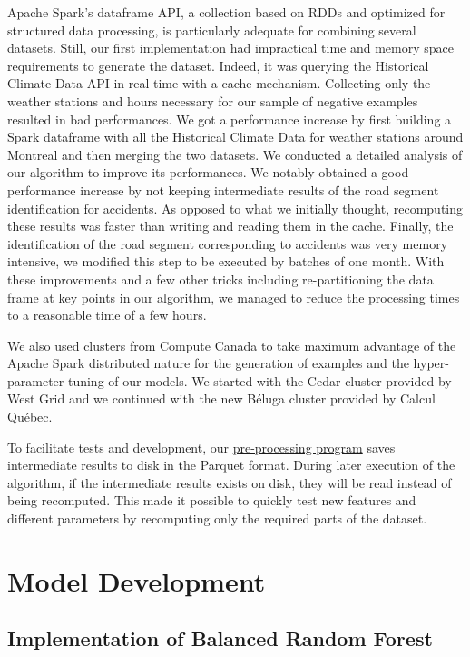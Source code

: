 \documentclass[conference]{IEEEtran}
\begin{document}
Apache Spark's dataframe API, a collection based on RDDs and optimized for 
structured data processing, is particularly adequate for
combining several datasets. Still, our first implementation had impractical
time and memory space requirements to generate the dataset. Indeed, it was querying
the Historical Climate Data API in real-time with a cache mechanism.
Collecting only the weather stations and hours necessary for our
sample of negative examples resulted in bad performances. We got a
performance increase by first building a Spark dataframe with all the
Historical Climate Data for weather stations around Montreal and then
merging the two datasets. We conducted a detailed analysis of our algorithm
to improve its performances. We notably obtained a good performance
increase by not keeping intermediate results of the road segment
identification for accidents. As opposed to what we initially thought,
recomputing these results was faster than writing and reading them in the
cache. Finally, the identification of the road segment corresponding to
accidents was very memory intensive, we modified this step to be executed
by batches of one month. With these improvements and a few other tricks
including re-partitioning the data frame at key points in our algorithm, we
managed to reduce the processing times to a reasonable time of a few hours.

We also used clusters from Compute Canada to take maximum advantage of the Apache Spark distributed nature for the generation of examples and the hyper-parameter tuning of our models. We started with the Cedar cluster provided by West Grid and we continued with the new B\'eluga cluster provided by Calcul Québec.

To facilitate tests and development, our \href{https://github.com/big-data-lab-team/accident-prediction-montreal/blob/master/preprocess.py}{pre-processing program} saves intermediate results to disk in the Parquet format. During later execution of the algorithm, if the intermediate results exists on disk, they will be read instead of being recomputed. This made it possible to quickly test new features and different parameters by recomputing only the required parts of the dataset.

\section{Model Development}
\label{sec:modeldev}

\subsection{Implementation of Balanced Random Forest}
\end{document}
